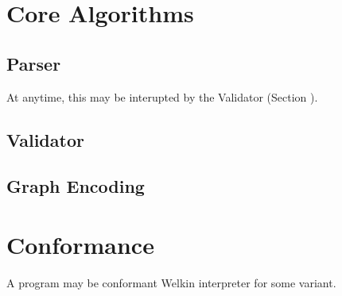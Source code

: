 \begin{itemize}

\section{Core Algorithms}

\subsection{Parser}


At anytime, this may be interupted by the Validator (Section \label{sec:validator}).

\subsection{Validator}
\label{sec:validator}


\subsection{Graph Encoding}

\section{Conformance}
A program may be conformant Welkin interpreter for some variant.


\end{itemize}
